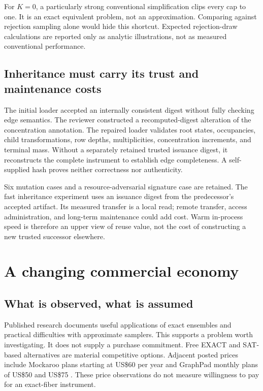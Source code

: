 \documentclass[11pt,letterpaper]{article}
\newcommand{\USD}[1]{US\$#1}
\begin{document}
For $K=0$, a particularly strong conventional simplification clips every cap to one.
It is an exact equivalent problem, not an approximation. Comparing against rejection
sampling alone would hide this shortcut. Expected rejection-draw calculations are
reported only as analytic illustrations, not as measured conventional performance.



\subsection{Inheritance must carry its trust and maintenance costs}

The initial loader accepted an internally consistent digest without fully checking
edge semantics. The reviewer constructed a recomputed-digest alteration of the
concentration annotation. The repaired loader validates root states, occupancies,
child transformations, row depths, multiplicities, concentration increments, and terminal
mass. Without a separately retained trusted issuance digest, it reconstructs the
complete instrument to establish edge completeness. A self-supplied hash proves
neither correctness nor authenticity.

Six mutation cases and a resource-adversarial signature case are retained. The fast
inheritance experiment uses an issuance digest from the predecessor's accepted artifact.
Its measured transfer is a local read; remote transfer, access administration, and
long-term maintenance could add cost. Warm in-process speed is therefore an upper
view of reuse value, not the cost of constructing a new trusted successor elsewhere.

\section{A changing commercial economy}

\subsection{What is observed, what is assumed}

Published research documents useful applications of exact ensembles and practical
difficulties with approximate samplers. This supports a problem worth investigating.
It does not supply a purchase commitment. Free EXACT and SAT-based alternatives are
material competitive options. Adjacent posted prices include Mockaroo plans starting
at \USD{60} per year and GraphPad monthly plans of \USD{50} and \USD{75}
\cite{mockaroo,graphpad}. These price observations do not measure willingness to pay
for an exact-fiber instrument.
\end{document}
